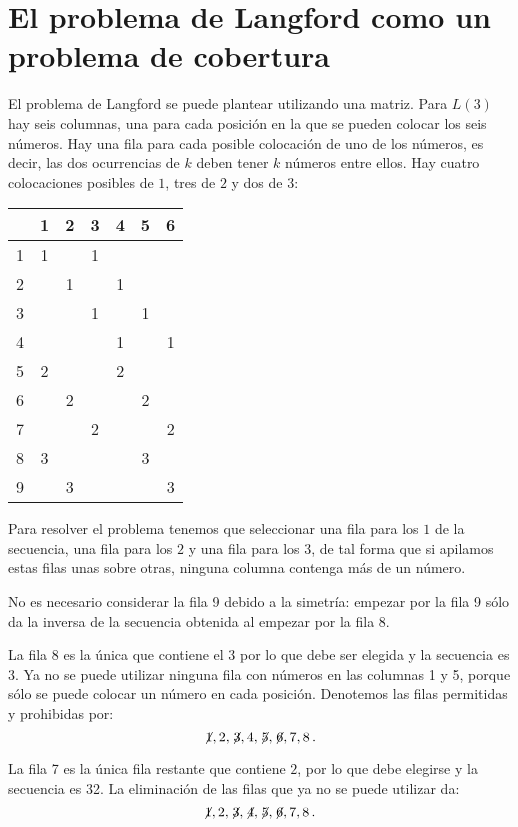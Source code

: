 \section{El problema de Langford como un problema de cobertura}\label{s.langford-covering}

El problema de Langford se puede plantear utilizando una matriz. Para $L(3)$ hay seis columnas, una para cada posición en la que se pueden colocar los seis números. Hay una fila para cada posible colocación de uno de los números, es decir, las dos ocurrencias de $k$ deben tener $k$ números entre ellos. Hay cuatro colocaciones posibles de $1$, tres de $2$ y dos de $3$:

\begin{center}
\addtolength{\tabcolsep}{4pt}
\begin{tabular}{|c||c|c|c|c|c|c|}
\hline
&1&2&3&4&5&6\\\hline\hline
1&1&&1&&&\\\hline
2&&1&&1&&\\\hline
3&&&1&&1&\\\hline
4&&&&1&&1\\\hline
5&2&&&2&&\\\hline
6&&2&&&2&\\\hline
7&&&2&&&2\\\hline
8&3&&&&3&\\\hline
9&&3&&&&3\\\hline
\end{tabular}
\end{center}
Para resolver el problema tenemos que seleccionar una fila para los $1$ de la secuencia, una fila para los $2$ y una fila para los $3$, de tal forma que si apilamos estas filas unas sobre otras, ninguna columna contenga más de un número.

No es necesario considerar la fila 9 debido a la simetría: empezar por la fila 9 sólo da la inversa de la secuencia obtenida al empezar por la fila 8.

La fila 8 es la única que contiene el $3$ por lo que debe ser elegida y la secuencia es 3\textvisiblespace \textvisiblespace {}\textvisiblespace. Ya no se puede utilizar ninguna fila con números en las columnas 1 y 5, porque sólo se puede colocar un número en cada posición. Denotemos las filas permitidas y prohibidas por:
\[\not\! 1,2,\not\! 3,4,\not\! 5, \not\! 6, 7, 8\,.\]

La fila 7 es la única fila restante que contiene $2$, por lo que debe elegirse y la secuencia es 32. La eliminación de las filas que ya no se puede utilizar da:
\[\not\! 1,2,\not\! 3,\not\! 4,\not\! 5, \not\! 6, 7, 8\,.\]

